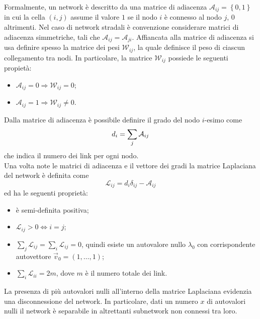 \documentclass[../main.tex]{subfiles}
\begin{document}
Formalmente, un network \`e descritto da una matrice di adiacenza $\mathcal{A}_{ij}=\left\{0,1\right\}$ in cui la cella $(i,j)$ assume il valore $1$ se il nodo $i$ \`e connesso al nodo $j$, $0$ altrimenti.
Nel caso di network stradali \`e convenzione considerare matrici di adiacenza simmetriche, tali che $\mathcal{A}_{ij}=\mathcal{A}_{ji}$.
Affiancata alla matrice di adiacenza si usa definire spesso la matrice dei pesi $\mathcal{W}_{ij}$, la quale definisce il peso di ciascun collegamento tra nodi.
In particolare, la matrice $\mathcal{W}_{ij}$ possiede le seguenti propiet\`a:
\begin{itemize}
    \item $\mathcal{A}_{ij} = 0 \Longrightarrow \mathcal{W}_{ij} = 0$;
    \item $\mathcal{A}_{ij} = 1 \Longrightarrow \mathcal{W}_{ij} \neq 0$.
\end{itemize}
Dalla matrice di adiacenza \`e possibile definire il grado del nodo $i$-esimo come
\begin{equation*}
    d_i=\sum_j\mathcal{A}_{ij}\\
\end{equation*}
che indica il numero dei link per ogni nodo.
\\Una volta note le matrici di adiacenza e il vettore dei gradi la matrice Laplaciana del network \`e definita come
\begin{equation}
    \mathcal{L}_{ij}=d_i\delta_{ij}-\mathcal{A}_{ij}
\end{equation}
ed ha le seguenti propriet\`a:
\begin{itemize}
    \item \`e semi-definita positiva;
    \item $\mathcal{L}_{ij}>0\Longleftrightarrow i=j$;
    \item $\sum_j\mathcal{L}_{ij}=\sum_i\mathcal{L}_{ij}=0$, quindi esiste un autovalore nullo $\lambda_0$ con corrispondente autovettore $\vec{v}_0=(1,\ldots,1)$;
    \item $\sum_i\mathcal{L}_{ii}=2m$, dove $m$ \`e il numero totale dei link.
\end{itemize}
La presenza di pi\`u autovalori nulli all'interno della matrice Laplaciana evidenzia una disconnessione del network.
In particolare, dati un numero $x$ di autovalori nulli il network \`e separabile in altrettanti subnetwork non connessi tra loro.
\end{document}
